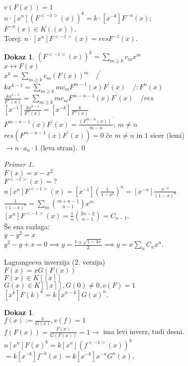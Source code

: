 \documentclass[a4paper, 12pt]{book}
\theoremstyle{definition}
\newtheorem{pro}[counter]{Dokaz}
\theoremstyle{remark}
\newtheorem*{ex}{Primer}
\begin{document}
$v(F(x)) = 1$ \\
$n \cdot [x^n] \left(F^{<-1>}(x)\right)^k = k \cdot [x^{-k}] F^{-n}(x)$; \\
$F^{-n}(x) \in K((x))$. \\
Torej: $n \cdot [x^n] F^{<-1>}(x) = res F^{-1}(x)$.
\begin{pro}
  $\left(F^{<-1>}(x)\right)^k = \sum_{m \geq k} c_m x^m$ \\
  $x \leftrightarrow F(x)$ \\
  $x^k = \sum_{m \geq k} c_m (F(x))^m \quad /^{'}$ \\
  $k x^{k-1} = \sum_{m \geq k} m c_m F^{m-1}(x) F^{'}(x) \quad /: F^n(x)$ \\
  $\frac{k x^{k-1}}{F^n(x)} = \sum_{m \geq k} m c_m F^{m-n-1}(x) F^{'}(x) \quad / res$ \\
  $[x^{-1}] \frac{k x^{k-1}}{F^n(x)} = [x^{-k}] \frac{k}{F^n(x)}$ \\
  $F^{m-n-1}(x) F^{'}(x) = \frac{\left(F^{m-n}(x)\right)^{'}}{m-n}$; $m \neq n$ \\
  $res \left(F^{m-n-1}(x) F^{'}(x)\right) = 0$ če $m \neq n$ in $1$ sicer (lemi) \\
  $\to n \cdot a_n \cdot 1$ (leva stran).
  \qed
\end{pro}
\begin{ex} \text{} \\
  $F(x) = x - x^2$ \\
  $F^{<-1>}(x) = ?$ \\
  $n [x^n] F^{<-1>}(x) = [x^{-1}] \left(\frac{1}{1-x^2}\right)^n = [x^{-n}] \frac{x^{-n}}{(1-x)^n}$ \\
  $\frac{1}{(1-x)^n} = \sum_m \binom{m+n-1}{n-1} x^m$ \\
  $[x^n] F^{<-1>}(x) = \frac{1}{n} \binom{2n-2}{n-1} = C_{n-1}$. \\
  Še ena razlaga: \\
  $y - y^2 = x$ \\
  $y^2 - y + x = 0 \implies y = \frac{1 \pm \sqrt{1-4x}}{2} \implies y = x \sum_n C_n x^n$.
\end{ex}
Lagrangeeva inverzija (2. verzija) \\
$F(x) = x G(F(x))$ \\
$F(x) \in K[[x]]$ \\
$G(x) \in K[[x]], G(0) \neq 0, v(F) = 1$ \\
$[x^k] F(k)^k = k [x^{n-k}] G(x)^n$.
\begin{pro} \text{} \\
  $f(x) := \frac{x}{G(x)}, v(f) = 1$ \\
  $f(F(x)) = \frac{F(x)}{G(F(x))} = 1 \to$ ima levi inverz, tudi desni. \\
  $n [x^n] F(x)^k = k [x^n] \left(f^{<-1>}(x)\right)^k$ \\
  $= k [x^{-k}] f^{-k}(x) = k [x^{-k}] x^{-n} G^n(x)$.
\end{pro}
\end{document}
